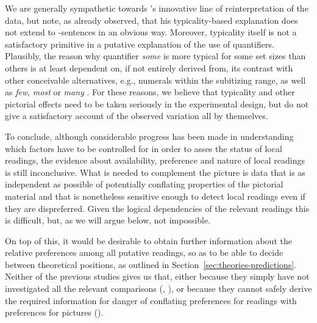 \documentclass[fleqn,reqno,10pt,draft]{article}
\renewcommand{\es}{\acro{es}}
\begin{document}
We are generally sympathetic towards
\citeauthor{Tielvan-Tiel2012:Embedded-Scalar}'s innovative line of
reinterpretation of the data, but note, as
\citet{ChemlaSpector2010:Experimental-Ev} already observed, that his
typicality-based explanation does not extend to \es-sentences in an
obvious way. Moreover, typicality itself is not a satisfactory
primitive in a putative explanation of the use of
quantifiers. Plausibly, the reason why quantifier \emph{some} is more
typical for some set sizes than others is at least dependent on, if
not entirely derived from, its contrast with other conceivable
alternatives, e.g., numerals within the subitizing range, as well as
\emph{few}, \emph{most} or \emph{many}
\citep[c.f.][]{DegenTanenhaus2012:Processing-Scal}. For these reasons,
we believe that typicality and other pictorial effects need to be
taken seriously in the experimental design, but do not give a
satisfactory account of the observed variation all by themselves.

To conclude, although considerable progress has been made in
understanding which factors have to be controlled for in order to
asses the status of local readings, the evidence about availability,
preference and nature of local readings is still inconclusive. What is
needed to complement the picture is data that is as independent as
possible of potentially conflating properties of the pictorial
material and that is nonetheless sensitive enough to detect local
readings even if they are dispreferred. Given the logical dependencies
of the relevant readings this is difficult, but, as we will argue
below, not impossible.

On top of this, it would be desirable to obtain further information
about the relative preferences among all putative readings, so as to
be able to decide between theoretical positions, as outlined in
Section~\ref{sec:theories-predictions}. Neither of the previous
studies gives us that, either because they simply have not
investigated all the relevant comparisons
(\citet{GeurtsPouscoulous2009:Embedded-Implic},
\citet{CliftonDube2010:Embedded-Implic}), or because they cannot
safely derive the required information for danger of conflating
preferences for readings with preferences for pictures
(\citet{ChemlaSpector2010:Experimental-Ev}).
\end{document}
